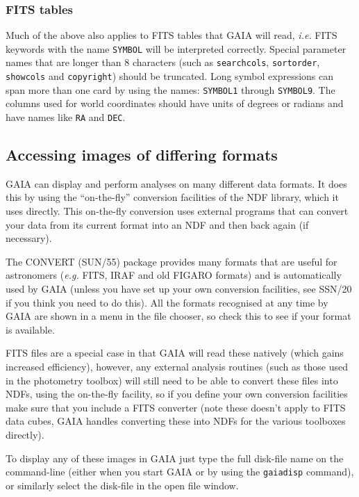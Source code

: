 \documentclass[twoside,11pt]{article}
\newcommand{\xref}[3]{#1}
\newcommand{\xlabel}[1]{}
\renewcommand{\_}{\texttt{\symbol{95}}}
\newcommand{\mytt}[1]{{\texttt{#1}}}
\begin{document}
\subsubsection{FITS tables} Much of the above also applies to FITS tables
that GAIA will read, \textit{i.e.} FITS keywords with the name
\mytt{SYMBOL} will be interpreted correctly. Special parameter names that are
longer than 8 characters (such as \mytt{search\_cols}, \mytt{sort\_order},
\mytt{show\_cols} and \mytt{copyright}) should be truncated. Long symbol
expressions can span more than one card by using the names: \mytt{SYMBOL1}
through \mytt{SYMBOL9}. The columns used for world coordinates should have
units of degrees or radians and have names like \mytt{RA} and \mytt{DEC}.

\subsection{\xlabel{image_formats}Accessing images of differing formats}

GAIA can display and perform analyses on many different data
formats. It does this by using the ``on-the-fly'' conversion
facilities of the NDF library, which it uses directly. This on-the-fly
conversion uses external programs that can convert your data from its
current format into an NDF and then back again (if necessary).

The CONVERT \xref{(SUN/55)}{sun55}{} package provides many formats
that are useful for astronomers (\textit{e.g.} FITS, IRAF and old FIGARO
formats) and is automatically used by GAIA (unless you have set up
your own conversion facilities, see \xref{SSN/20}{ssn20}{} if you
think you need to do this). All the formats recognised at any time by
GAIA are shown in a menu in the file chooser, so check this to see
if your format is available.

FITS files are a special case in that GAIA will read these natively
(which gains increased efficiency), however, any external analysis
routines (such as those used in the photometry toolbox) will still
need to be able to convert these files into NDFs, using the on-the-fly
facility, so if you define your own conversion facilities make sure
that you include a FITS converter (note these doesn't apply to FITS
data cubes, GAIA handles converting these into NDFs for the various toolboxes
directly).

To display any of these images in GAIA just type the full disk-file
name on the command-line (either when you start GAIA or by using the
\mytt{gaiadisp} command), or similarly select the disk-file in the
open file window.
\end{document}
